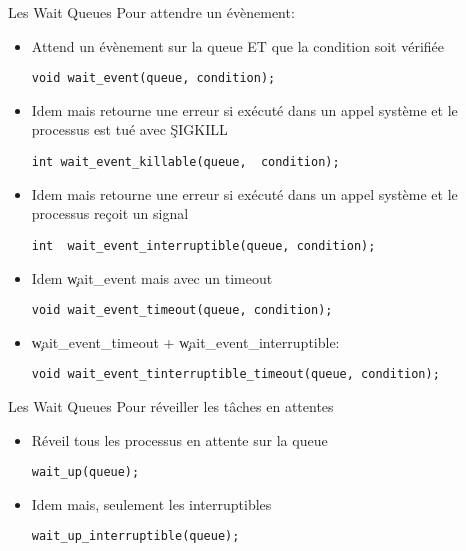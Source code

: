 \begin{frame}[fragile=singleslide]{Les Wait Queues}
  Pour attendre un évènement:
    \begin{itemize} 
    \item Attend  un évènement sur la  queue ET que  la condition soit
      vérifiée
      \begin{lstlisting} 
void wait_event(queue, condition);
      \end{lstlisting} 
    \item  Idem mais  retourne une  erreur  si exécuté  dans un  appel
      système et le processus est tué avec \c{SIGKILL}
      \begin{lstlisting} 
int wait_event_killable(queue,  condition);
      \end{lstlisting} 
    \item  Idem mais  retourne une  erreur  si exécuté  dans un  appel
      système et le processus reçoit un signal
      \begin{lstlisting} 
int  wait_event_interruptible(queue, condition);
      \end{lstlisting} 
    \item   Idem \c{wait_event} mais avec un timeout
      \begin{lstlisting} 
void wait_event_timeout(queue, condition);
      \end{lstlisting} 
    \item \c{wait_event_timeout} + \c{wait_event_interruptible}:
      \begin{lstlisting} 
void wait_event_tinterruptible_timeout(queue, condition);
      \end{lstlisting} 
    \end{itemize}    
\end{frame}

\begin{frame}[fragile=singleslide]{Les Wait Queues}
  Pour réveiller les tâches en attentes
    \begin{itemize}
    \item Réveil tous les processus en attente sur la queue
      \begin{lstlisting} 
wait_up(queue); 
      \end{lstlisting} 
    \item Idem mais, seulement les interruptibles
      \begin{lstlisting}
wait_up_interruptible(queue);
      \end{lstlisting} 
    \end{itemize}
\end{frame} 

